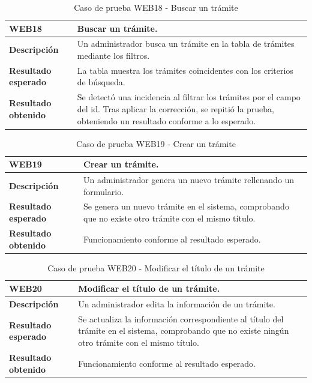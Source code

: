     \begin{table}[H]
        \centering
        \begin{tabular}{|l|p{12cm}|}
        \hline
        \textbf{WEB18} & Buscar un trámite. \\ \hline
        \textbf{Descripción} & Un administrador busca un trámite en la tabla de trámites mediante los filtros. \\ \hline
        \textbf{Resultado esperado} & La tabla muestra los trámites coincidentes con los criterios de búsqueda. \\ \hline
        \textbf{Resultado obtenido} & Se detectó una incidencia al filtrar los trámites por el campo del id. 
            Tras aplicar la corrección, se repitió la prueba, obteniendo un resultado conforme a lo esperado. \\ \hline
        \end{tabular}
        \caption{Caso de prueba WEB18 - Buscar un trámite}
    \end{table}

    \begin{table}[H]
        \centering
        \begin{tabular}{|l|p{12cm}|}
        \hline
        \textbf{WEB19} & Crear un trámite. \\ \hline
        \textbf{Descripción} & Un administrador genera un nuevo trámite rellenando un formulario. \\ \hline
        \textbf{Resultado esperado} & Se genera un nuevo trámite en el sistema, comprobando que no existe otro trámite con el mismo título. \\ \hline
        \textbf{Resultado obtenido} & Funcionamiento conforme al resultado esperado. \\ \hline
        \end{tabular}
        \caption{Caso de prueba WEB19 - Crear un trámite}
    \end{table}

    \begin{table}[H]
        \centering
        \begin{tabular}{|l|p{12cm}|}
        \hline
        \textbf{WEB20} & Modificar el título de un trámite. \\ \hline
        \textbf{Descripción} & Un administrador edita la información de un trámite. \\ \hline
        \textbf{Resultado esperado} & Se actualiza la información correspondiente al título del trámite en el sistema, comprobando que no existe ningún otro trámite con el mismo título. \\ \hline
        \textbf{Resultado obtenido} & Funcionamiento conforme al resultado esperado. \\ \hline
        \end{tabular}
        \caption{Caso de prueba WEB20 - Modificar el título de un trámite}
    \end{table}

